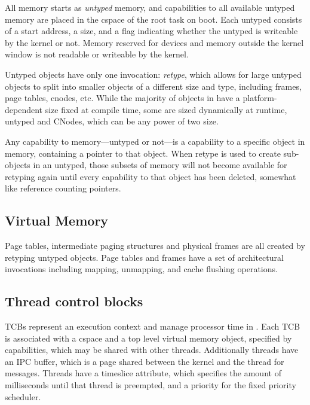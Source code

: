 All memory starts as \emph{untyped} memory, and capabilities to all available untyped memory are placed in the
cspace of the root task on boot. Each untyped consists of a start address, a size, and a flag
indicating whether the untyped is writeable by the kernel or not. Memory reserved for devices and
memory outside the kernel window is not readable or writeable by the kernel. 

Untyped objects have only one invocation: \emph{retype}, which allows for large untyped objects to
split into smaller objects of a different size and type, including frames, page tables, cnodes, etc. 
While the majority of objects in \selfour have a platform-dependent size fixed at compile time, some
are sized dynamically at runtime, \eg untyped and CNodes, which can be any power of two size.

Any capability to memory---untyped or not---is a capability to a specific object in memory,
containing a pointer to that object. When retype is used to create sub-objects in an untyped, those
subsets of memory will not become available for retyping again until every capability to that object has been deleted, somewhat like reference counting pointers.

\subsection{Virtual Memory}

Page tables, intermediate paging structures and physical frames are all created by retyping
untyped objects. Page tables and frames have a set of architectural invocations including mapping, unmapping, and cache flushing operations.

\subsection{Thread control blocks}

\Glspl{TCB} represent an execution context and manage processor time in \selfour. Each \gls{TCB} is
associated with a cspace and a top level virtual memory object, specified by capabilities, which may
be shared with other threads. 
Additionally threads have an IPC buffer, which is a page shared between the kernel and the thread
for messages. 
Threads have a timeslice attribute, which specifies the amount of milliseconds until that thread is
preempted, and a priority for the fixed priority scheduler.

